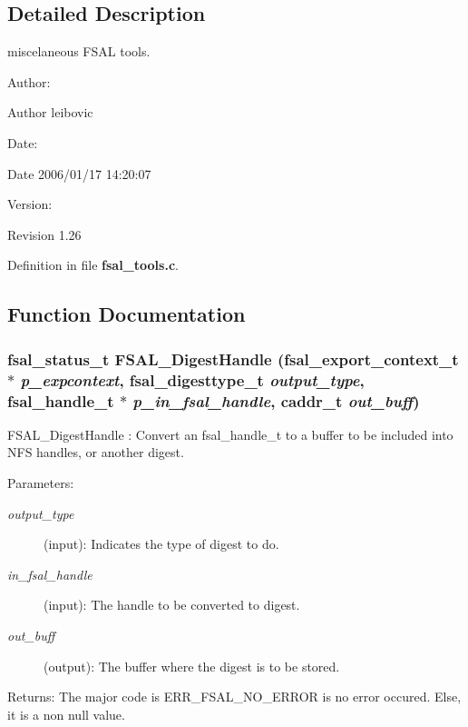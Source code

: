 \subsection{Detailed Description}
miscelaneous FSAL tools. 

\begin{Desc}
\item[Author:]\begin{Desc}
\item[Author]leibovic \end{Desc}
\end{Desc}
\begin{Desc}
\item[Date:]\begin{Desc}
\item[Date]2006/01/17 14:20:07 \end{Desc}
\end{Desc}
\begin{Desc}
\item[Version:]\begin{Desc}
\item[Revision]1.26 \end{Desc}
\end{Desc}


Definition in file {\bf fsal\_\-tools.c}.

\subsection{Function Documentation}
\subsubsection{\setlength{\rightskip}{0pt plus 5cm}fsal\_\-status\_\-t FSAL\_\-Digest\-Handle (fsal\_\-export\_\-context\_\-t $\ast$ {\em p\_\-expcontext}, fsal\_\-digesttype\_\-t {\em output\_\-type}, fsal\_\-handle\_\-t $\ast$ {\em p\_\-in\_\-fsal\_\-handle}, caddr\_\-t {\em out\_\-buff})}\label{fsal__tools_8c_a6}


FSAL\_\-Digest\-Handle : Convert an fsal\_\-handle\_\-t to a buffer to be included into NFS handles, or another digest.

\begin{Desc}
\item[Parameters:]
\begin{description}
\item[{\em output\_\-type}](input): Indicates the type of digest to do. \item[{\em in\_\-fsal\_\-handle}](input): The handle to be converted to digest. \item[{\em out\_\-buff}](output): The buffer where the digest is to be stored.\end{description}
\end{Desc}
\begin{Desc}
\item[Returns:]The major code is ERR\_\-FSAL\_\-NO\_\-ERROR is no error occured. Else, it is a non null value. \end{Desc}


